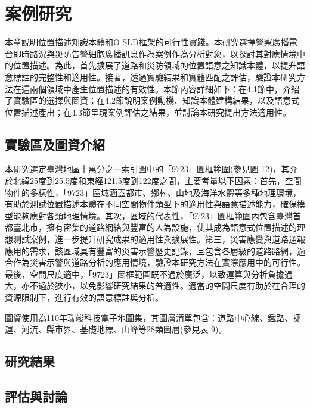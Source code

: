 
\chapter{案例研究}

本章說明位置描述知識本體和O-SLD框架的可行性實踐。本研究選擇警察廣播電台即時路況與災防告警細胞廣播訊息作為案例作為分析對象，以探討其對應情境中的位置描述。為此，首先擴展了道路和災防領域的位置語意之知識本體，以提升語意標註的完整性和適用性。接著，透過實驗結果和實體匹配之評估，驗證本研究方法在這兩個領域中產生位置描述的有效性。本節內容詳細如下：在4.1節中，介紹了實驗區的選擇與圖資；在4.2節說明案例動機、知識本體建構結果，以及語意式位置描述產出；在4.3節呈現案例評估之結果，並討論本研究提出方法適用性。

\section{實驗區及圖資介紹}

本研究選定臺灣地區十萬分之一索引圖中的「9723」圖框範圍(參見圖 12)，其介於北緯25度到25.5度和東經121.5度到122度之間，主要考量以下因素：首先，空間物件的多樣性，「9723」區域涵蓋都市、鄉村、山地及海洋水體等多種地理環境，有助於測試位置描述本體在不同空間物件類型下的適用性與語意描述能力，確保模型能夠應對各類地理情境。其次，區域的代表性，「9723」圖框範圍內包含臺灣首都臺北市，擁有密集的道路網絡與豐富的人為設施，使其成為語意式位置描述的理想測試案例，進一步提升研究成果的適用性與擴展性。第三，災害應變與道路通報應用的需求，該區域具有豐富的災害示警歷史記錄，且包含各層級的道路路網，適合作為災害示警與道路分析的應用情境，驗證本研究方法在實際應用中的可行性。最後，空間尺度適中，「9723」圖框範圍既不過於廣泛，以致運算與分析負擔過大，亦不過於狹小，以免影響研究結果的普適性。適當的空間尺度有助於在合理的資源限制下，進行有效的語意標註與分析。

圖資使用為110年瑞竣科技電子地圖集，其圖層清單包含：道路中心線、鐵路、捷運、河流、縣市界、基礎地標、山峰等28類圖層(參見表 9)。

\section{研究結果}

\section{評估與討論}
